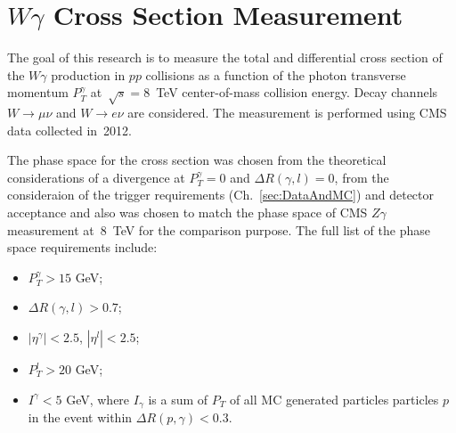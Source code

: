 \chapter{$W\gamma$ Cross Section Measurement}
\label{sec:AN_WgMeas}

The goal of this research is to measure the total and differential cross section of the $W\gamma$ production in $pp$ collisions as a function of the photon transverse momentum $P_T^\gamma$ at~$\sqrt{s}=8$~TeV center-of-mass collision energy. Decay channels $W\rightarrow\mu\nu$ and $W\rightarrow e\nu$ are considered. The measurement is performed using CMS data collected in~2012.

The phase space for the cross section was chosen from the theoretical considerations of a divergence at $P_T^{\gamma}=0$ and $\Delta{R}(\gamma,l)=0$, from the consideraion of the trigger requirements (Ch.~\ref{sec:DataAndMC}) and detector acceptance and also was chosen to match the phase space of CMS $Z\gamma$ measurement at~8~TeV for the comparison purpose. The full list of the phase space requirements include:
\begin{itemize}
  \item $P_T^{\gamma}>15$ GeV;
  \item $\Delta{R}(\gamma,l) > 0.7$;
  \item $|\eta^{\gamma}|<2.5$, $|\eta^{l}|<2.5$;
  \item $P_T^{l}>20$ GeV;
  \item $I^{\gamma}<5$ GeV, where $I_{\gamma}$ is a sum of $P_T$ of all MC generated particles particles $p$ in the event within $\Delta{R(p,\gamma)}<0.3$.
\end{itemize}
